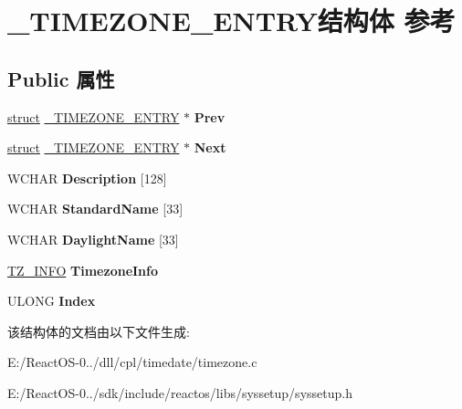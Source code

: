 \hypertarget{struct___t_i_m_e_z_o_n_e___e_n_t_r_y}{}\section{\+\_\+\+T\+I\+M\+E\+Z\+O\+N\+E\+\_\+\+E\+N\+T\+R\+Y结构体 参考}
\label{struct___t_i_m_e_z_o_n_e___e_n_t_r_y}
\subsection*{Public 属性}
\begin{DoxyCompactItemize}
\item 
\mbox{\label{struct___t_i_m_e_z_o_n_e___e_n_t_r_y_a8cf2f6ff3a97cfdca2dc9e22a355c865}} 
\hyperlink{interfacestruct}{struct} \hyperlink{struct___t_i_m_e_z_o_n_e___e_n_t_r_y}{\+\_\+\+T\+I\+M\+E\+Z\+O\+N\+E\+\_\+\+E\+N\+T\+RY} $\ast$ {\bfseries Prev}
\item 
\mbox{\label{struct___t_i_m_e_z_o_n_e___e_n_t_r_y_ab3413cca7a85d8b250d371e1b7bb108c}} 
\hyperlink{interfacestruct}{struct} \hyperlink{struct___t_i_m_e_z_o_n_e___e_n_t_r_y}{\+\_\+\+T\+I\+M\+E\+Z\+O\+N\+E\+\_\+\+E\+N\+T\+RY} $\ast$ {\bfseries Next}
\item 
\mbox{\label{struct___t_i_m_e_z_o_n_e___e_n_t_r_y_addd055de7f637e10250d4f5e3a8ab5eb}} 
W\+C\+H\+AR {\bfseries Description} \mbox{[}128\mbox{]}
\item 
\mbox{\label{struct___t_i_m_e_z_o_n_e___e_n_t_r_y_a73e55c4852183b1940aa8bc7a142bcad}} 
W\+C\+H\+AR {\bfseries Standard\+Name} \mbox{[}33\mbox{]}
\item 
\mbox{\label{struct___t_i_m_e_z_o_n_e___e_n_t_r_y_a86a6e988f759b12293e6514be16514e4}} 
W\+C\+H\+AR {\bfseries Daylight\+Name} \mbox{[}33\mbox{]}
\item 
\mbox{\label{struct___t_i_m_e_z_o_n_e___e_n_t_r_y_a7444ccb5ce92a5840ef6ee34d40558fa}} 
\hyperlink{struct___t_z___i_n_f_o}{T\+Z\+\_\+\+I\+N\+FO} {\bfseries Timezone\+Info}
\item 
\mbox{\label{struct___t_i_m_e_z_o_n_e___e_n_t_r_y_af7d993bff04440d34b16b6aab5155017}} 
U\+L\+O\+NG {\bfseries Index}
\end{DoxyCompactItemize}


该结构体的文档由以下文件生成\+:\begin{DoxyCompactItemize}
\item 
E\+:/\+React\+O\+S-\/0../dll/cpl/timedate/timezone.\+c\item 
E\+:/\+React\+O\+S-\/0../sdk/include/reactos/libs/syssetup/syssetup.\+h\end{DoxyCompactItemize}
